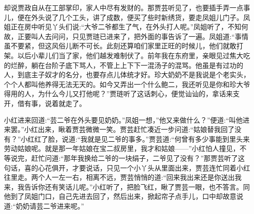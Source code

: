 \begin{parag}
    却说贾政自从在工部掌印，家人中尽有发财的。那贾芸听见了，也要插手弄一点事儿，便在外头说了几个工头，讲了成数，便买了些时新绣货，要走凤姐儿门子。凤姐正在房中听见丫头们说:“大爷二爷都生了气，在外头打人呢。”凤姐听了，不知何故，正要叫人去问问，只见贾琏已进来了，把外面的事告诉了一遍。凤姐道:“事情虽不要紧，但这风俗儿断不可长。此刻还算咱们家里正旺的时候儿，他们就敢打架。以后小辈儿们当了家，他们越发难制伏了。前年我在东府里，亲眼见过焦大吃的烂醉，躺在台阶子底下骂人，不管上上下下一混汤子的混骂。他虽是有过功的人，到底主子奴才的名分，也要存点儿体统才好。珍大奶奶不是我说是个老实头，个个人都叫他养得无法无天的。如今又弄出一个什么鲍二，我还听见是你和珍大爷得用的人，为什么今儿又打他呢？”贾琏听了这话刺心，便觉讪讪的，拿话来支开，借有事，说着就走了。
\end{parag}


\begin{parag}
    小红进来回道:“芸二爷在外头要见奶奶。”凤姐一想，”他又来做什么？”便道:“叫他进来罢。”小红出来，瞅着贾芸微微一笑。贾芸赶忙凑近一步问道:“姑娘替我回了没有？”小红红了脸，说道:“我就是见二爷的事多。”贾芸道:“何曾有多少事能到里头来劳动姑娘呢。就是那一年姑娘在宝二叔房里，我才和姑娘——”小红怕人撞见，不等说完，赶忙问道:“那年我换给二爷的一块绢子，二爷见了没有？”那贾芸听了这句话，喜的心花俱开，才要说话，只见一个小丫头从里面出来，贾芸连忙同着小红往里走。两个人一左一右，相离不远，贾芸悄悄的道:“回来我出来还是你送出我来，我告诉你还有笑话儿呢。”小红听了，把脸飞红，瞅了贾芸一眼，也不答言。同他到了凤姐门口，自己先进去回了，然后出来，掀起帘子点手儿，口中却故意说道:“奶奶请芸二爷进来呢。”
\end{parag}


